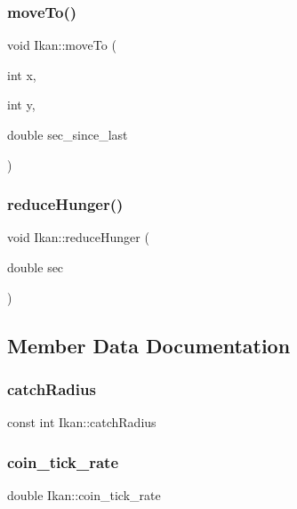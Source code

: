 \subsubsection{\texorpdfstring{move\+To()}{moveTo()}}
{\footnotesize\ttfamily void Ikan\+::move\+To (\begin{DoxyParamCaption}\item[{int}]{x,  }\item[{int}]{y,  }\item[{double}]{sec\+\_\+since\+\_\+last }\end{DoxyParamCaption})}

\mbox{\label{class_ikan_aadb3eab63a3277d12d0cd4af5a9c96aa}} 
\subsubsection{\texorpdfstring{reduce\+Hunger()}{reduceHunger()}}
{\footnotesize\ttfamily void Ikan\+::reduce\+Hunger (\begin{DoxyParamCaption}\item[{double}]{sec }\end{DoxyParamCaption})}



\subsection{Member Data Documentation}
\mbox{\label{class_ikan_a7d6507a938bda54ba96d224e27a12b71}} 
\subsubsection{\texorpdfstring{catch\+Radius}{catchRadius}}
{\footnotesize\ttfamily const int Ikan\+::catch\+Radius\hspace{0.3cm}{\ttfamily [protected]}}

\mbox{\label{class_ikan_af6c55901dcc5cfbdcc8b30798949118e}} 
\subsubsection{\texorpdfstring{coin\+\_\+tick\+\_\+rate}{coin\_tick\_rate}}
{\footnotesize\ttfamily double Ikan\+::coin\+\_\+tick\+\_\+rate\hspace{0.3cm}{\ttfamily [protected]}}

